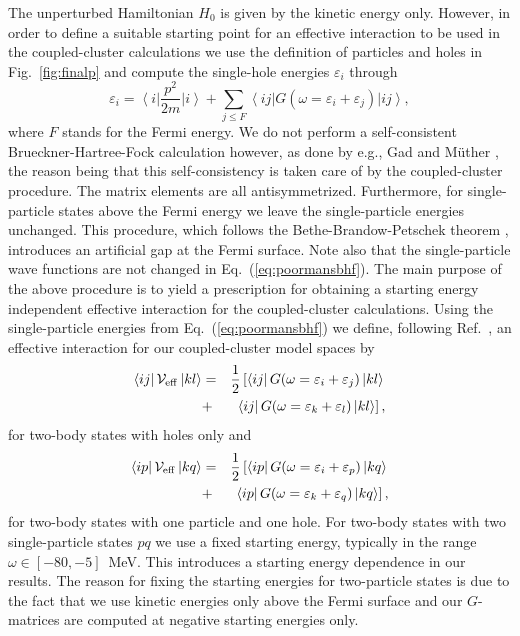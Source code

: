 The unperturbed Hamiltonian $H_0$ is given by  the kinetic energy only.
However, in order to define a suitable starting point for 
an effective interaction to be used
in the coupled-cluster calculations we use the 
definition of particles and holes in 
Fig.~\ref{fig:finalp} and compute the single-hole energies $\varepsilon_i$ through 
\begin{equation}    \label{eq:poormansbhf}
  \varepsilon_i = \left\langle i\right | \frac{p^2}{2m} \left | i \right \rangle +\sum_{j \leq F}  \left\langle ij\right | G(\omega=\varepsilon_i+\varepsilon_j) \left | ij\right\rangle, 
\end{equation}
where $F$ stands for the Fermi energy. We do not perform a self-consistent Brueckner-Hartree-Fock 
calculation however, as done by e.g., Gad and M\"uther \cite{herbert02}, the reason being that
this self-consistency is taken care of by the coupled-cluster procedure.
The matrix elements are all
antisymmetrized.
Furthermore, for single-particle states above the Fermi energy we leave the single-particle energies
unchanged. This procedure, which follows the Bethe-Brandow-Petschek theorem \cite{bbp63}, 
introduces an artificial gap at the Fermi surface. 
Note also that the single-particle wave functions are not changed in Eq.~(\ref{eq:poormansbhf}). 
The main purpose of the above procedure is to yield a 
prescription for obtaining
a starting energy independent effective interaction 
for the coupled-cluster 
calculations. Using the single-particle energies from 
Eq.~(\ref{eq:poormansbhf}) 
we define, following Ref.~\cite{herbert02}, an effective
interaction for our coupled-cluster model spaces by 
\begin{eqnarray}
    \left\langle ij \right | {\cal V}_{\mathrm{eff}} \left |
kl \right\rangle
&=& \frac{1}{2} \left[ \left\langle ij \right |
G(\omega=\varepsilon_i+\varepsilon_j) \left | kl \right\rangle \right. 
\nonumber \\ 
&+&  \left.\left\langle ij\right | 
G(\omega=\varepsilon_k+\varepsilon_l) \left |  kl\right\rangle \right], 
\label{eq:gmat1approx}
\end{eqnarray}
for two-body states with holes only and 
\begin{eqnarray}
    \left\langle ip \right | {\cal V}_{\mathrm{eff}}\left | kq \right\rangle 
&=& \frac{1}{2}\left[ \left\langle ip \right | G(\omega=\varepsilon_i
+\varepsilon_p) \left | kq \right\rangle \right. \nonumber \\
&+& \left. \left\langle ip \right | G(\omega=\varepsilon_k+\varepsilon_q) 
\left | kq \right\rangle \right], 
\label{eq:gmat2approx}
\end{eqnarray}
for two-body states with one particle and one hole. For two-body states with two single-particle
states $pq$ we use a fixed starting energy, typically in the range $\omega \in [-80,-5]$~MeV. 
This introduces a starting energy 
dependence in our results. The reason for fixing the starting
energies for two-particle states is due to the fact that we use kinetic energies only above the
Fermi surface and our $G$-matrices are computed at negative starting energies only.

